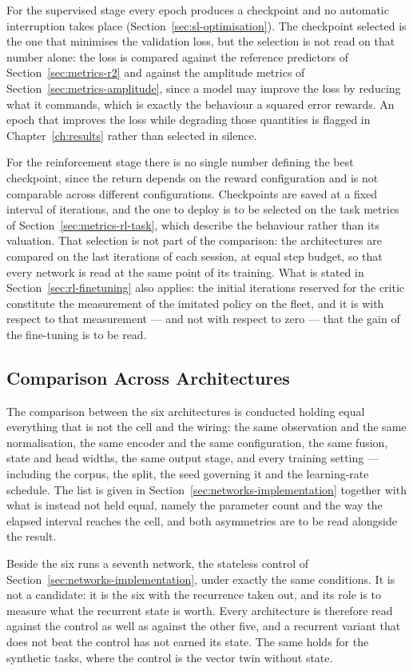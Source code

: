For the supervised stage every epoch produces a checkpoint and no automatic
interruption takes place (Section~\ref{sec:sl-optimisation}). The checkpoint
selected is the one that minimises the validation loss, but the selection is not
read on that number alone: the loss is compared against the reference predictors
of Section~\ref{sec:metrics-r2} and against the amplitude metrics of
Section~\ref{sec:metrics-amplitude}, since a model may improve the loss by
reducing what it commands, which is exactly the behaviour a squared error
rewards. An epoch that improves the loss while degrading those quantities is
flagged in Chapter~\ref{ch:results} rather than selected in silence.

For the reinforcement stage there is no single number defining the best
checkpoint, since the return depends on the reward configuration and is not
comparable across different configurations. Checkpoints are saved at a fixed
interval of iterations, and the one to deploy is to be selected on the task
metrics of Section~\ref{sec:metrics-rl-task}, which describe the behaviour
rather than its valuation. That selection is not part of the comparison: the
architectures are compared on the last iterations of each session, at equal
step budget, so that every network is read at the same point of its training. What is stated in Section~\ref{sec:rl-finetuning} also applies: the
initial iterations reserved for the critic constitute the measurement of the
imitated policy on the fleet, and it is with respect to that measurement --- and
not with respect to zero --- that the gain of the fine-tuning is to be read.

\subsection{Comparison Across Architectures}

The comparison between the six architectures is conducted holding equal
everything that is not the cell and the wiring: the same observation and the
same normalisation, the same encoder and the same configuration, the same fusion,
state and head widths, the same output stage, and every training setting ---
including the corpus, the split, the seed governing it and the learning-rate
schedule. The list is given in Section~\ref{sec:networks-implementation}
together with what is instead not held equal, namely the parameter count and the
way the elapsed interval reaches the cell, and both asymmetries are to be read
alongside the result.

Beside the six runs a seventh network, the stateless control of
Section~\ref{sec:networks-implementation}, under exactly the same conditions. It
is not a candidate: it is the six with the recurrence taken out, and its role is
to measure what the recurrent state is worth. Every architecture is therefore
read against the control as well as against the other five, and a recurrent
variant that does not beat the control has not earned its state. The same
holds for the synthetic tasks, where the control is the vector twin without
state.

